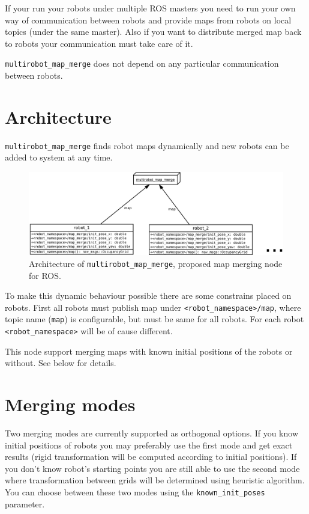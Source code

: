 If your run your robots under multiple ROS masters you need to run your own way of communication between robots and provide maps from robots on local topics (under the same master). Also if you want to distribute merged map back to robots your communication must take care of it.


\texttt{multirobot\_map\_merge} does not depend on any particular communication between robots.

\section{Architecture}

\texttt{multirobot\_map\_merge} finds robot maps dynamically and new robots can be added to system at any time.

\begin{figure}
    \centering
    \includegraphics[width=\textwidth]{../img/map_merge_architecture.pdf}
    \caption[Architecture of \texttt{multirobot\_map\_merge}.]{Architecture of \texttt{multirobot\_map\_merge}, proposed map merging node for \gls{ROS}.}
    \label{fig:mapmergearchitecture}
\end{figure}

To make this dynamic behaviour possible there are some constrains placed on robots. First all robots must publish map under \texttt{<robot\_namespace>/map}, where topic name (\texttt{map}) is configurable, but must be same for all robots. For each robot \texttt{<robot\_namespace>} will be of cause different.

This node support merging maps with known initial positions of the robots or without. See below for details.

\section{Merging modes}
\label{sec:mergingmodes}

Two merging modes are currently supported as orthogonal options. If you know initial positions of robots you may preferably use the first mode and get exact results (rigid transformation will be computed according to initial positions). If you don't know robot's starting points you are still able to use the second mode where transformation between grids will be determined using heuristic algorithm. You can choose between these two modes using the \texttt{known\_init\_poses} parameter.

